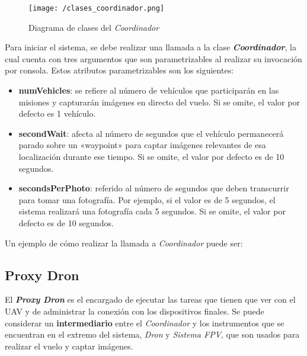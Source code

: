 \begin{figure}[!h]
\begin{center}
\texttt{[image: /clases\_coordinador.png]}
\caption[Diagrama de clases del \textit{Coordinador}]{Diagrama de clases del \textit{Coordinador}}
\label{fig:diagclasescoord}
\end{center}
\end{figure}

Para iniciar el sistema, se debe realizar una llamada a la clase \textbf{\textit{Coordinador}}, la cual cuenta con tres argumentos que son parametrizables al realizar su invocación por consola. Estos atributos parametrizables son los siguientes:
\begin{itemize}
\item \textbf{numVehicles}: se refiere al número de vehículos que participarán en las misiones y capturarán imágenes en directo del vuelo. Si se omite, el valor por defecto es 1 vehículo.
\item \textbf{secondWait}: afecta al número de segundos que el vehículo permanecerá parado sobre un «waypoint» para captar imágenes relevantes de esa localización durante ese tiempo. Si se omite, el valor por defecto es de 10 segundos.
\item \textbf{secondsPerPhoto}: referido al número de segundos que deben transcurrir para tomar una fotografía. Por ejemplo, si el valor es de 5 segundos, el sistema realizará una fotografía cada 5 segundos. Si se omite, el valor por defecto es de 10 segundos.
\end{itemize} 

Un ejemplo de cómo realizar la llamada a \textit{Coordinador} puede ser:



\subsection{Proxy Dron}
\label{sec:proxydron}

El \textbf{\textit{Proxy Dron}} es el encargado de ejecutar las tareas que tienen que ver con el \acs{UAV} y de administrar la conexión con los dispositivos finales. Se puede considerar un \textbf{intermediario} entre el \textit{Coordinador} y los instrumentos que se encuentran en el extremo del sistema, \textit{Dron} y \textit{Sistema \acs{FPV}}, que son usados para realizar el vuelo y captar imágenes.

